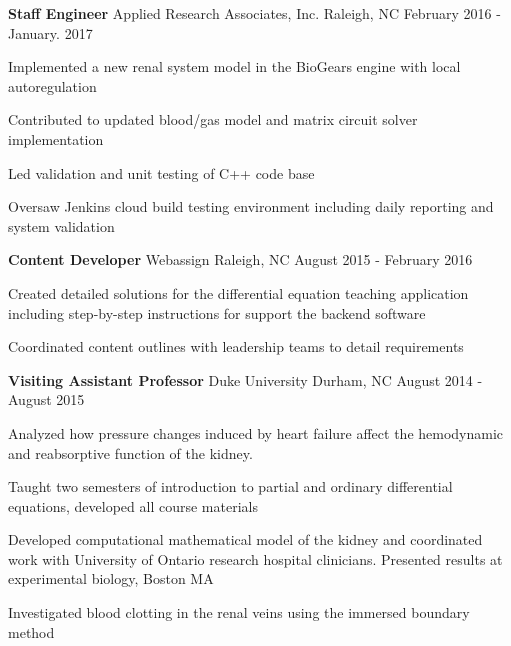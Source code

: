 \begin{cventries}
  \cventry
    {\textbf{Staff Engineer}}%
    {Applied Research Associates, Inc.} %
    {Raleigh, NC} %
    {February 2016 - January. 2017} %
    {
      \begin{cvitems} %
        \item {Implemented a new renal system model in the BioGears engine with local autoregulation}
        \item {Contributed to updated blood/gas model and matrix circuit solver implementation}
        \item {Led validation and unit testing of C++ code base}
        \item {Oversaw Jenkins cloud build testing environment including daily reporting and system validation}
      \end{cvitems}
    }

  \cventry
    {\textbf{Content Developer}} %
    {Webassign} %
    {Raleigh, NC} %
    {August 2015 - February 2016} %
    {
      \begin{cvitems} %
        \item {Created detailed solutions for the differential equation teaching application including step-by-step instructions for support the backend software}
        \item {Coordinated content outlines with leadership teams to detail requirements}
      \end{cvitems}
    }

  \cventry
    {\textbf{Visiting Assistant Professor}} %
    {Duke University} %
    {Durham, NC} %
    {August 2014 - August 2015} %
    {
      \begin{cvitems} %
        \item {Analyzed how pressure changes induced by heart failure affect the hemodynamic and reabsorptive
function of the kidney.}
		    \item {Taught two semesters of introduction to partial and ordinary differential equations, developed all course materials}
        \item {Developed computational mathematical model of the kidney and coordinated work with University of Ontario research hospital clinicians. Presented results at experimental biology, Boston MA}
        \item {Investigated blood clotting in the renal veins using the immersed boundary method}
      \end{cvitems}
    }


\end{cventries}
